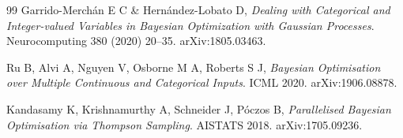 \documentclass[12pt,a4paper]{article}
\begin{document}
\begin{thebibliography}{99}
Garrido-Merch\'{a}n E C \& Hern\'{a}ndez-Lobato D, \textit{Dealing with Categorical and Integer-valued Variables in Bayesian Optimization with Gaussian Processes}. Neurocomputing 380 (2020) 20--35. arXiv:1805.03463.

Ru B, Alvi A, Nguyen V, Osborne M A, Roberts S J, \textit{Bayesian Optimisation over Multiple Continuous and Categorical Inputs}. ICML 2020. arXiv:1906.08878.

Kandasamy K, Krishnamurthy A, Schneider J, P\'{o}czos B, \textit{Parallelised Bayesian Optimisation via Thompson Sampling}. AISTATS 2018. arXiv:1705.09236.

\end{thebibliography}
\end{document}

